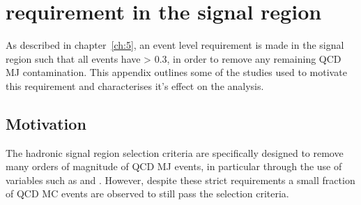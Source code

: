 \chapter{\mindphistar requirement in the signal region}
\label{ch:app_dphistar}

As described in chapter~\ref{ch:5}, an event level requirement is made in the
signal region such that all events have \mindphistar > 0.3, in order to remove
any remaining QCD MJ contamination. This appendix outlines some of
the studies used to motivate this requirement and characterises it's effect on
the analysis.

\section{Motivation}

The hadronic signal region selection criteria are specifically
designed to remove many orders of magnitude of QCD MJ events, in particular
through the use of variables such as \alphat and \mhtmet.
However, despite these strict requirements a small fraction of QCD MC events are
observed to still pass the selection criteria.

